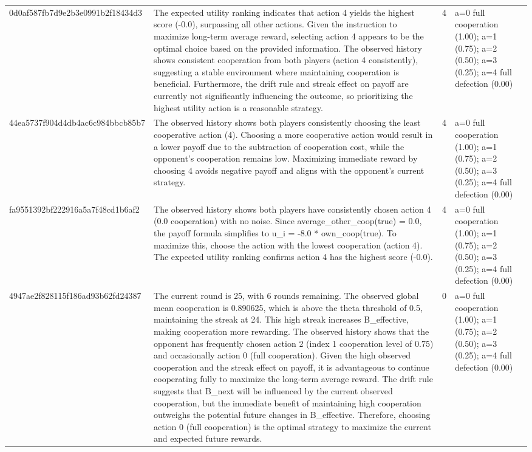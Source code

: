 \begin{tabular}{lp{8cm}ll l}
0d0af587fb7d9e2b3e0991b2f18434d3 & The expected utility ranking indicates that action 4 yields the highest score (-0.0), surpassing all other actions. Given the instruction to maximize long-term average reward, selecting action 4 appears to be the optimal choice based on the provided information. The observed history shows consistent cooperation from both players (action 4 consistently), suggesting a stable environment where maintaining cooperation is beneficial. Furthermore, the drift rule and streak effect on payoff are currently not significantly influencing the outcome, so prioritizing the highest utility action is a reasonable strategy. & 4 & a=0 full cooperation (1.00); a=1 (0.75); a=2 (0.50); a=3 (0.25); a=4 full defection (0.00) &  \\
44ea5737f904d4db4ac6c984bbcb85b7 & The observed history shows both players consistently choosing the least cooperative action (4). Choosing a more cooperative action would result in a lower payoff due to the subtraction of cooperation cost, while the opponent's cooperation remains low. Maximizing immediate reward by choosing 4 avoids negative payoff and aligns with the opponent's current strategy. & 4 & a=0 full cooperation (1.00); a=1 (0.75); a=2 (0.50); a=3 (0.25); a=4 full defection (0.00) &  \\
fa9551392bf222916a5a7f48cd1b6af2 & The observed history shows both players have consistently chosen action 4 (0.0 cooperation) with no noise. Since average\_other\_coop(true) = 0.0, the payoff formula simplifies to u\_i = -8.0 * own\_coop(true). To maximize this, choose the action with the lowest cooperation (action 4). The expected utility ranking confirms action 4 has the highest score (-0.0). & 4 & a=0 full cooperation (1.00); a=1 (0.75); a=2 (0.50); a=3 (0.25); a=4 full defection (0.00) &  \\
4947ae2f828115f186ad93b62fd24387 & The current round is 25, with 6 rounds remaining. The observed global mean cooperation is 0.890625, which is above the theta threshold of 0.5, maintaining the streak at 24. This high streak increases B\_effective, making cooperation more rewarding. The observed history shows that the opponent has frequently chosen action 2 (index 1 cooperation level of 0.75) and occasionally action 0 (full cooperation). Given the high observed cooperation and the streak effect on payoff, it is advantageous to continue cooperating fully to maximize the long-term average reward. The drift rule suggests that B\_next will be influenced by the current observed cooperation, but the immediate benefit of maintaining high cooperation outweighs the potential future changes in B\_effective. Therefore, choosing action 0 (full cooperation) is the optimal strategy to maximize the current and expected future rewards. & 0 & a=0 full cooperation (1.00); a=1 (0.75); a=2 (0.50); a=3 (0.25); a=4 full defection (0.00) &  \\

\end{tabular}
